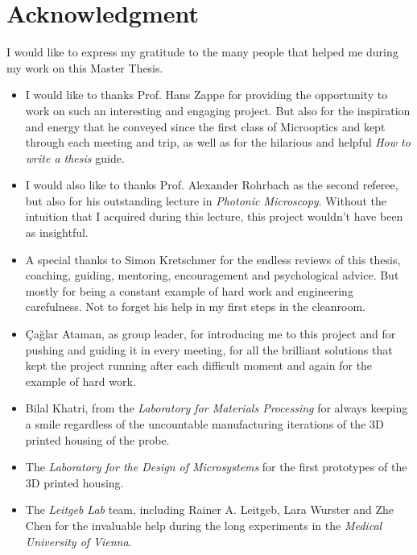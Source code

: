 \chapter*{Acknowledgment}     %
%

I would like to express my gratitude to the many people that helped me during my work on this Master Thesis.

\begin{itemize}

\item I would like to thanks Prof. Hans Zappe for providing the opportunity to work on such an interesting and engaging project. But also for the inspiration and energy that he conveyed since the first class of Microoptics and kept through each meeting and trip, as well as for the hilarious and helpful \textit{How to write a thesis} guide. 

\item I would also like to thanks Prof. Alexander Rohrbach as the second referee, but also for his outstanding lecture in \textit{Photonic Microscopy}. Without the intuition that I acquired during this lecture, this project wouldn't have been as insightful.

\item A special thanks to Simon Kretschmer for the endless reviews of this thesis, coaching, guiding, mentoring, encouragement and psychological advice. But mostly for being a constant example of hard work and engineering carefulness. Not to forget his help in my first steps in the cleanroom.

\item Çağlar Ataman, as group leader, for introducing me to this project and for pushing and guiding it in every meeting, for all the brilliant solutions that kept the project running after each difficult moment and again for the example of hard work.

\item Bilal Khatri, from the \textit{Laboratory for Materials Processing} for always keeping a smile regardless of the uncountable manufacturing iterations of the 3D printed housing of the probe.

\item The \textit{Laboratory for the Design of Microsystems} for the first prototypes of the 3D printed housing.

\item The \textit{Leitgeb Lab} team, including Rainer A. Leitgeb, Lara Wurster and Zhe Chen for the invaluable help during the long experiments in the \textit{Medical University of Vienna}.


\end{itemize}

